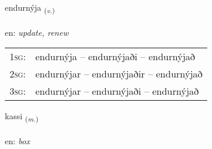 \documentclass[frontgrid, backgrid]{flacards}\usepackage[]{graphicx}\usepackage[]{xcolor}
\begin{document}
\renewcommand{\flhead}{\vskip5pt \fboxsep=0pt {\small\bfseries\footnotesize Sagnorð | Verb}}
\renewcommand{\fcfoot}{\vskip5pt \fboxsep=0pt \hspace{2pt}{\small\bfseries\footnotesize 3K}}

\renewcommand{\blhead}{\vskip5pt {\small\bfseries\footnotesize Sagnorð | Verb }}
\renewcommand{\bcfoot}{\vskip5pt \hspace{2pt}{\small\bfseries\footnotesize 3K}}


{endurnýja \small{\textsubscript{(\textit{v.})}} \\[1ex] %
\textphonetic{[ɛntʏrnija]} \\
en: \emph{update, renew} \\  [2ex]
\renewcommand*{\arraystretch}{0.8}
\begin{tabular}{p{1cm}l}
\textsc{1sg}: & endurnýja -- endurnýjaði -- endurnýjað \\ 
\textsc{2sg}: & endurnýjar -- endurnýjaðir -- endurnýjað \\ 
\textsc{3sg}: & endurnýjar -- endurnýjaði -- endurnýjað \\ 
\end{tabular}
}

\renewcommand{\flhead}{\vskip5pt \fboxsep=0pt {\small\bfseries\footnotesize Nafnorð | Noun}}
\renewcommand{\fcfoot}{\vskip5pt \fboxsep=0pt \hspace{2pt}{\small\bfseries\footnotesize 3K}}

\renewcommand{\blhead}{\vskip5pt {\small\bfseries\footnotesize Nafnorð | Noun }}
\renewcommand{\bcfoot}{\vskip5pt \hspace{2pt}{\small\bfseries\footnotesize 3K}}


{kassi \small{\textsubscript{(\textit{m.})}} \\[1ex] %
\textphonetic{[kʰasɪ]} \\
en: \emph{box} \\  [2ex]
\renewcommand*{\arraystretch}{0.8}
}
\end{document}
